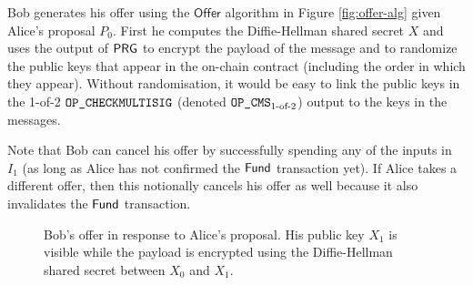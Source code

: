 \documentclass[runningheads]{llncs}
\begin{document}
Bob generates his offer using the $\textsf{Offer}$ algorithm in Figure \ref{fig:offer-alg} given Alice's proposal $P_0$. First he computes the Diffie-Hellman shared secret $X$ and uses the output of $\textsf{PRG}$ to encrypt the payload of the message and to randomize the public keys that appear in the on-chain contract (including the order in which they appear). Without randomisation, it would be easy to link the public keys in the 1-of-2 $\texttt{OP\_CHECKMULTISIG}$\cite{opcheckmultisig} (denoted $\texttt{OP\_CMS}_{\text{1-of-2}}$) output to the keys in the messages.

Note that Bob can cancel his offer by successfully spending any of the inputs in $I_1$ (as long as Alice has not confirmed the $\textsf{Fund}$ transaction yet). If Alice takes a different offer, then this notionally cancels his offer as well because it also invalidates the $\textsf{Fund}$ transaction.

\begin{figure}[!h]
\centering
\caption{Bob's offer in response to Alice's proposal. His public key $X_1$ is visible while the payload is encrypted using the Diffie-Hellman shared secret between $X_0$ and $X_1$.}
\label{fig:bob-offer}
\end{figure}
\end{document}
